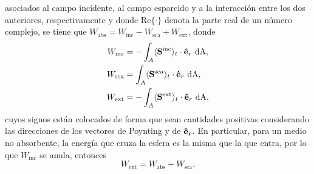 \noindent asociados al campo incidente, al campo esparcido y a la interacción entre los dos anteriores, respectivamente y donde Re$\{\cdot\}$ denota la parte real de un número complejo, se tiene que $W_{\text{abs}}=W_{\text{inc}}-W_{\text{sca}}+W_{\text{ext}}$, donde \cite{bohrenAbsorptionScatteringLight2008}
%
\begin{align} \label{eqs:W}
	W_{\text{inc}}  &= -\int_{A}\langle\vb{S}^{\text{inc}}\rangle_t\cdot\vu{e}_r\text{ dA},\label{Wi}\\ W_{\text{sca}}&=\int_{A}\langle\vb{S^{\text{sca}}}\rangle_t\cdot\vu{e}_r\text{ dA}, \label{Ws} \\ 
	W_{\text{ext}} &= -\int_{A}\langle\vb{S^{\text{ext}}}\rangle_t\cdot\vu{e}_r\text{ dA},\label{Wext} 
\end{align}
%
cuyos signos están colocados de forma que sean cantidades positivas considerando las direcciones de los vectores de Poynting y de $\vb{\hat{e}_r}$. En particular, para un medio no absorbente, la energía que cruza la esfera es la misma que la que entra, por lo que $W_{\text{inc}}$ se anula, entonces
%
\begin{equation}
	W_{\text{ext}}=W_{\text{abs}}+W_{\text{sca}}.
	\label{Wext_tot}
\end{equation}

